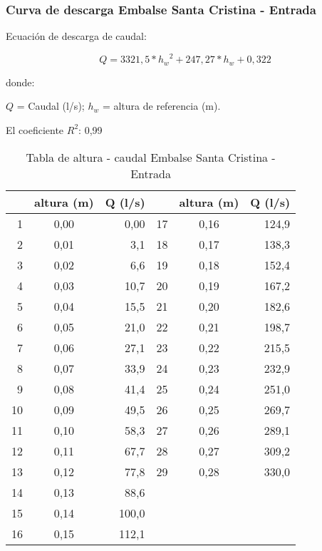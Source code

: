 \documentclass[]{article}
\begin{document}
\subsubsection{Curva de descarga Embalse Santa Cristina - Entrada}\label{CD Embalse Santa Cristina - Entrada}

Ecuación de descarga de caudal:

\[Q = 3321,5* {{h_w}^2} + 247,27* h_w + 0,322\]

donde:

\(Q\) = Caudal (l/s); \(h_w\) = altura de referencia (m).

El coeficiente \(R^2\): 0,99


\begin{table}[H]

\caption{Tabla de altura - caudal Embalse Santa Cristina - Entrada}
\centering

\begin{center}
\begingroup\fontsize{10pt}{11pt}\selectfont
\begin{tabular}{rcrrcr}
  \hline
 & altura (m) & Q (l/s) &  & altura (m) & Q (l/s) \\ 
  \hline
  1 & 0,00 & 0,00 &  17 & 0,16 & 124,9 \\ 
    2 & 0,01 & 3,1 &  18 & 0,17 & 138,3 \\ 
    3 & 0,02 & 6,6 &  19 & 0,18 & 152,4 \\ 
    4 & 0,03 & 10,7 &  20 & 0,19 & 167,2 \\ 
    5 & 0,04 & 15,5 &  21 & 0,20 & 182,6 \\ 
    6 & 0,05 & 21,0 &  22 & 0,21 & 198,7 \\ 
    7 & 0,06 & 27,1 &  23 & 0,22 & 215,5 \\ 
    8 & 0,07 & 33,9 &  24 & 0,23 & 232,9 \\ 
    9 & 0,08 & 41,4 &  25 & 0,24 & 251,0 \\ 
   10 & 0,09 & 49,5 &  26 & 0,25 & 269,7 \\ 
   11 & 0,10 & 58,3 &  27 & 0,26 & 289,1 \\ 
   12 & 0,11 & 67,7 &  28 & 0,27 & 309,2 \\ 
   13 & 0,12 & 77,8 &  29 & 0,28 & 330,0 \\ 
   14 & 0,13 & 88,6 &  &  &  \\ 
   15 & 0,14 & 100,0 &  &  &  \\ 
   16 & 0,15 & 112,1 &  &  &  \\ 
   \hline
\end{tabular}
\endgroup\end{center}
\end{table}
\end{document}
